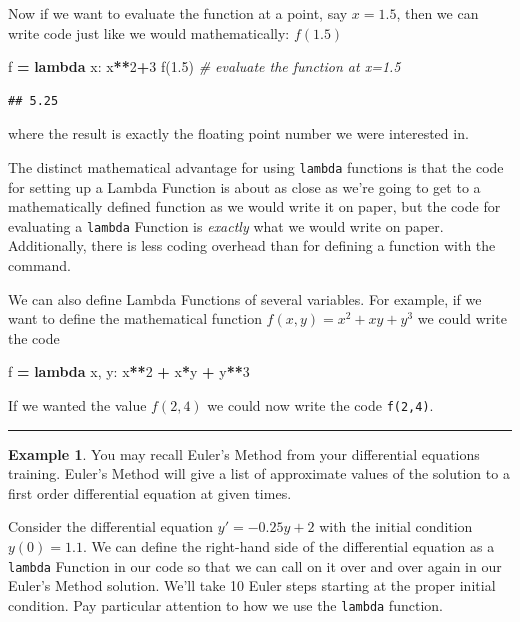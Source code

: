 \documentclass[
]{book}
\newenvironment{Shaded}{\begin{snugshade}}{\end{snugshade}}
\newcommand{\CommentTok}[1]{\textcolor[rgb]{0.56,0.35,0.01}{\textit{#1}}}
\newcommand{\DecValTok}[1]{\textcolor[rgb]{0.00,0.00,0.81}{#1}}
\newcommand{\FloatTok}[1]{\textcolor[rgb]{0.00,0.00,0.81}{#1}}
\newcommand{\KeywordTok}[1]{\textcolor[rgb]{0.13,0.29,0.53}{\textbf{#1}}}
\newcommand{\NormalTok}[1]{#1}
\newcommand{\OperatorTok}[1]{\textcolor[rgb]{0.81,0.36,0.00}{\textbf{#1}}}
\theoremstyle{definition}
\theoremstyle{definition}
\newtheorem{example}{Example}[chapter]
\theoremstyle{definition}
\theoremstyle{remark}
\begin{document}
Now if we want to evaluate the function at a point, say \(x=1.5\), then we can write code just like we would mathematically: \(f(1.5)\)

\begin{Shaded}
\begin{Highlighting}[]
\NormalTok{f }\OperatorTok{=} \KeywordTok{lambda}\NormalTok{ x: x}\OperatorTok{**}\DecValTok{2}\OperatorTok{+}\DecValTok{3}
\NormalTok{f(}\FloatTok{1.5}\NormalTok{) }\CommentTok{\# evaluate the function at x=1.5}
\end{Highlighting}
\end{Shaded}

\begin{verbatim}
## 5.25
\end{verbatim}

where the result is exactly the floating point number we were interested in.

The distinct mathematical advantage for using \texttt{lambda} functions is that the code for setting up a Lambda Function is about as close as we're going to get to a mathematically defined function as we would write it on paper, but the code for evaluating a \texttt{lambda} Function is \emph{exactly} what we would write on paper. Additionally, there is less coding overhead than for defining a function with the command.

We can also define Lambda Functions of several variables. For example, if we want to define the mathematical function \(f(x,y) = x^2 + xy + y^3\) we could write the code

\begin{Shaded}
\begin{Highlighting}[]
\NormalTok{f }\OperatorTok{=} \KeywordTok{lambda}\NormalTok{ x, y: x}\OperatorTok{**}\DecValTok{2} \OperatorTok{+}\NormalTok{ x}\OperatorTok{*}\NormalTok{y }\OperatorTok{+}\NormalTok{ y}\OperatorTok{**}\DecValTok{3}
\end{Highlighting}
\end{Shaded}

If we wanted the value \(f(2,4)\) we could now write the code \texttt{f(2,4)}.

\begin{center}\rule{0.5\linewidth}{0.5pt}\end{center}

\begin{example}
\protect\hypertarget{exm:unnamed-chunk-695}{}{\label{exm:unnamed-chunk-695} }You may recall Euler's Method from your differential equations training. Euler's Method will give a list of approximate values of the solution to a first order differential equation at given times.

Consider the differential equation \(y' = -0.25y + 2\) with the initial condition \(y(0) = 1.1\). We can define the right-hand side of the differential equation as a \texttt{lambda} Function in our code so that we can call on it over and over again in our Euler's Method solution. We'll take 10 Euler steps starting at the proper initial condition. Pay particular attention to how we use the \texttt{lambda} function.
\end{example}
\end{document}
